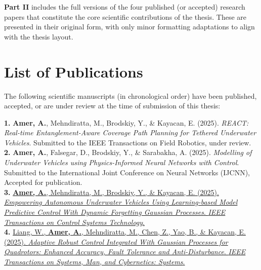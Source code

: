 \textbf{Part II} includes the full versions of the four published (or accepted) research papers that constitute the core scientific contributions of the thesis. These are presented in their original form, with only minor formatting adaptations to align with the thesis layout.







\section*{List of Publications}
The following scientific manuscripts (in chronological order) have been published, accepted, or are under review at the time of submission of this thesis:

\vspace{1em}


\textbf{1.} \textbf{Amer, A.}, Mehndiratta, M., Brodskiy, Y., \& Kayacan, E. (2025). \textit{REACT: Real-time Entanglement-Aware Coverage Path Planning for Tethered Underwater Vehicles}. Submitted to the IEEE Transactions on Field Robotics, under review.\\[0.8em]

\textbf{2.} \textbf{Amer, A.}, Falsegar, D., Brodskiy, Y., \& Sarabakha, A. (2025). \textit{Modelling of Underwater Vehicles using Physics-Informed Neural Networks with Control}. Submitted to the International Joint Conference on Neural Networks (IJCNN), Accepted for publication.\\[0.8em]

\textbf{3.} \href{https://ieeexplore.ieee.org/document/10916556/authors#authors}{\textbf{Amer, A.}, Mehndiratta, M., Brodskiy, Y., \& Kayacan, E. (2025). \textit{Empowering Autonomous Underwater Vehicles Using Learning-based Model Predictive Control With Dynamic Forgetting Gaussian Processes}. \textit{IEEE Transactions on Control Systems Technology}.}\\[0.8em]

\textbf{4.} \href{https://ieeexplore.ieee.org/document/10900576}{Liang, W., \textbf{Amer, A.}, Mehndiratta, M., Chen, Z., Yao, B., \& Kayacan, E. (2025). \textit{Adaptive Robust Control Integrated With Gaussian Processes for Quadrotors: Enhanced Accuracy, Fault Tolerance and Anti-Disturbance}. \textit{IEEE Transactions on Systems, Man, and Cybernetics: Systems}.}\\[0.8em]

